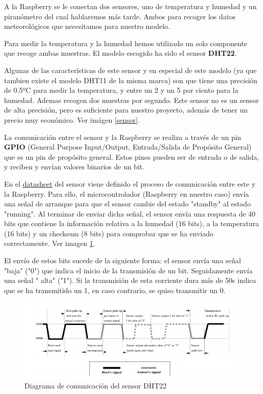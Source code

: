 A la Raspberry se le conectan dos sensores, uno de temperatura y humedad y un piranómetro del cual hablaremos más tarde. Ambos para recoger los datos meteorológicos que necesitamos para nuestro modelo.

Para medir la temperatura y la humedad hemos utilizado un solo componente que recoge ambas muestras. El modelo escogido ha sido el sensor \textbf{DHT22}.

Algunas de las características de este sensor y en especial de este modelo (ya que tambien existe el modelo DHT11 de la misma marca) son que tiene una precisión de 0.5ºC para medir la temperatura, y entre un 2 y un 5 por ciento para la humedad. Ademas recogen dos muestras por segundo. Este sensor no es un sensor de alta precisión, pero es suficiente para nuestro proyecto, además de tener un precio muy económico. Ver imágen \ref{sensor}.

La comunicación entre el sensor y la Raspberry se realiza a través de un pin \textbf{GPIO} (General Purpose Input/Output, Entrada/Salida de Propósito General) que es un pin de propósito general. Estos pines pueden ser de entrada o de salida, y reciben y envían valores binarios de un bit.

En el \href{https://cdn-shop.adafruit.com/datasheets/Digital+humidity+and+temperature+sensor+AM2302.pdf}{datasheet} del sensor viene definido el proceso de comunicación entre este y la Raspberry. Para ello, el microcontrolador (Raspberry en nuestro caso) envía una señal de arranque para que el sensor cambie del estado "standby" al estado "running". Al terminar de enviar dicha señal, el sensor envía una respuesta de 40 bits que contiene la información relativa a la humedad (16 bits), a la temperatura (16 bits) y un checksum (8 bits) para comprobar que se ha enviado correctamente. Ver imagen \ref{DHT22comunication}.

El envío de estos bits sucede de la siguiente forma: el sensor envía una señal "baja" ("0") que indica el inicio de la transmisión de un bit. Seguidamente envía una señal " alta" ("1"). Si la transmisión de esta corriente dura más de 50\mu s indica que se ha transmitido un 1, en caso contrario, se quiso transmitir un 0.

\begin{figure}[htb]
	
	\begin{center}
		\includegraphics[width=15cm]{figures/DTH22comunicationdiagram.png}
		\caption{Diagrama de comunicación del sensor DHT22}
	\end{center}
	
	\label{DHT22comunication}
\end{figure} 

